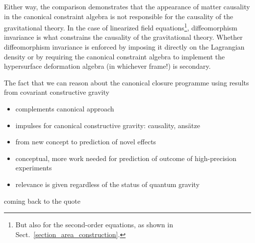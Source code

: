 Either way, the comparison demonstrates that the appearance of matter causality in the canonical constraint algebra is not responsible for the causality of the gravitational theory. In the case of linearized field equations\footnote{But also for the second-order equations, as shown in Sect.~\ref{section_area_construction}.}, diffeomorphism invariance is what constrains the causality of the gravitational theory. Whether diffeomorphism invariance is enforced by imposing it directly on the Lagrangian density or by requiring the canonical constraint algebra to implement the hypersurface deformation algebra (in whichever frame!) is secondary.

The fact that we can reason about the canonical closure programme using results from covariant constructive gravity

\begin{itemize}
\item complements canonical approach
\item impulses for canonical constructive gravity: causality, ansätze
\item from new concept to prediction of novel effects
\item conceptual, more work needed for prediction of outcome of high-precision experiments
\item relevance is given regardless of the status of quantum gravity
\end{itemize}

coming back to the quote
